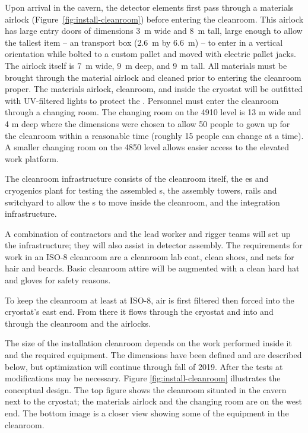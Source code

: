 Upon arrival in the cavern, the detector elements first pass through a materials airlock (Figure~\ref{fig:install-cleanroom}) before entering the cleanroom. This airlock has large entry doors of dimensions \SI{3}{m} wide and \SI{8}{m} tall, large enough to allow the tallest item -- an  transport box (\SI{2.6}{m} by \SI{6.6}{m}) -- to enter in a vertical orientation while bolted to a custom pallet and moved with electric pallet jacks. 
The airlock itself is \SI{7}{m} wide, \SI{9}{m} deep, and \SI{9}{m} tall. All materials must be brought through the material airlock and cleaned prior to entering the cleanroom proper. 
The materials airlock, cleanroom, and inside the cryostat will be outfitted with UV-filtered lights to protect the . 
Personnel must enter the cleanroom through a changing room. The changing room on the 4910 level is 13 \si{m} wide and 4 \si{m} deep where the dimensions were chosen to allow 50 people to gown up for the cleanroom within a reasonable time (roughly 15 people can change at a time). A smaller changing room on the 4850 level allows easier access to the elevated work platform.


The cleanroom infrastructure consists of the cleanroom itself, the \coldbox{}es and cryogenics plant for testing the assembled s, the assembly towers, rails and switchyard to allow the s to move inside the cleanroom, and the  integration infrastructure. 

A combination of contractors and the lead worker and rigger teams will set up the infrastructure;  they will also assist in detector assembly. 
The requirements for work in an ISO-8 cleanroom are a cleanroom lab coat, clean shoes, and nets for hair and beards.  Basic cleanroom attire will be augmented with a clean hard hat and gloves for safety reasons. 

To keep the cleanroom at least at ISO-8, air is first filtered then forced into the cryostat's east end. 
From there it flows through the cryostat and into and through the cleanroom and the airlocks. 


The size of the installation cleanroom depends on the work performed inside it and the required equipment. The dimensions have been defined and are described below, but optimization will continue through fall of 2019.
After the tests at  modifications may be necessary. 
Figure \ref{fig:install-cleanroom} illustrates  the conceptual design. The top figure shows the cleanroom situated in the cavern next to the cryostat; the materials airlock and the changing room are on the west end. The bottom image is a closer view showing some of the equipment in the cleanroom. 

